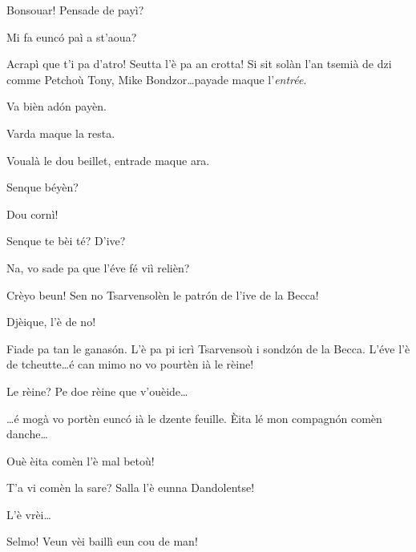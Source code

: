 \begin{drama}

\Dorinaspeaks{} Bonsouar! Pensade de payì?

\Pinospeaks	Mi fa eunc\'o paì a st'aoua?

\Genespeaks{}	Acrapì que t'i pa d'atro! Seutta l'è pa an crotta! Si sit solàn l'an tsemià de dzi comme  Petchoù Tony, Mike Bondzor\ldots payade maque l'\textit{entrée}.

\Pinospeaks{} Va bièn ad\'on payèn.


\Pinospeaks{} Varda maque la resta.

\Dorinaspeaks Voualà le dou beillet, entrade maque ara.


\Pinospeaks{} Senque béyèn?

\Geppinospeaks{} Dou cornì!


\Pinospeaks {} Senque te bèi té? D'ive? 

\Walterspeaks	Na, vo sade pa que l'éve fé viì relièn?

\Pinospeaks	Crèyo beun! Sen no Tsarvensolèn le patr\'on de l'ive de la Becca!

\Geppinospeaks{} Djèique, l'è de no!

\Walterspeaks	Fiade pa tan le ganas\'on. L'è pa pi icrì Tsarvensoù i sondz\'on de la Becca. L'éve l'è de tcheutte\ldots é can mimo no vo pourtèn ià le rèine!

\Pinospeaks Le rèine? Pe doe rèine que v'ouèide\ldots

\Walterspeaks \ldots é mogà vo portèn eunc\'o ià le dzente feuille.  \`Eita lé mon compagn\'on comèn danche\ldots

\Pinospeaks Ouè èita comèn l'è mal betoù!

\Walterspeaks T'a vi comèn la sare? Salla l'è eunna Dandolentse!

\Pinospeaks{} L'è vrèi\ldots

\Walterspeaks Selmo! Veun vèi baillì eun cou de man!
 

\end{drama}
